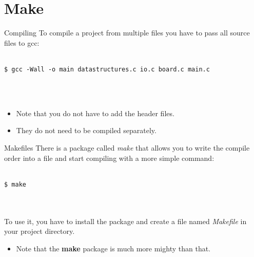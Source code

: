 \section{Make}
\begin{frame}[fragile]{Compiling}
	To compile a project from multiple files you have to pass all source files to gcc:\\\ \\
	\begin{lstlisting}[numbers=none]
$ gcc -Wall -o main datastructures.c io.c board.c main.c
    \end{lstlisting}\ \\\ \\
	\begin{itemize}
		\item Note that you do not have to add the header files.
		\item They do not need to be compiled separately.
	\end{itemize}
\end{frame}


\begin{frame}[fragile]{Makefiles}
	There is a package called \textit{make} that allows you to write the compile order into a file and start compiling with a more simple command:\\\ \\
	\begin{lstlisting}[numbers=none]
$ make
    \end{lstlisting}\ \\\ \\
	To use it, you have to install the package and create a file named \textit{Makefile} in your project directory.\\
	\begin{itemize}
		\item Note that the \textbf{make} package is much more mighty than that.
	\end{itemize}
\end{frame}


